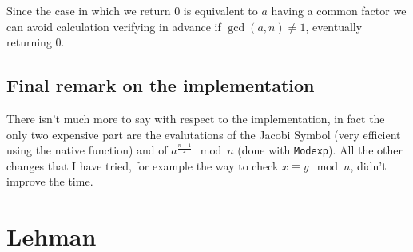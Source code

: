 \documentclass{article}
\theoremstyle{plain}
\theoremstyle{remark}
\theoremstyle{definition}
\begin{document}
Since the case in which we return $0$ is equivalent to $a$ having a common factor we can avoid calculation verifying in advance if $\gcd(a,n) \neq 1$, eventually returning $0$. 

\subsection{Final remark on the implementation}

There isn't much more to say with respect to the implementation, in fact the only two expensive part are the evalutations of the Jacobi Symbol (very efficient using the native function) and of $a^{\frac{n-1}{2}} \mod n$ (done with \texttt{Modexp}). All the other changes that I have tried, for example the way to check $x\equiv y \mod n$, didn't improve the time.  



\section{Lehman}

\appendix


\newpage
\printbibliography
\end{document}
